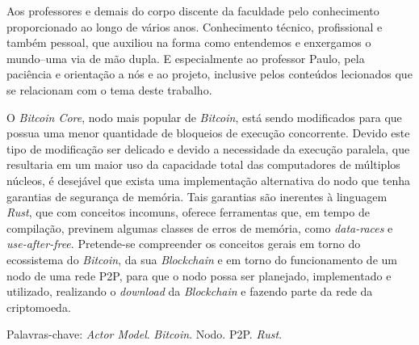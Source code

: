 
\OnehalfSpacing

\imprimircapa

\imprimirfolhaderosto





\begin{agradecimentos}[Agradecimentos]
Aos professores e demais do corpo discente da faculdade pelo conhecimento proporcionado ao longo de vários anos. Conhecimento técnico, profissional e também pessoal, que auxiliou na forma como entendemos e enxergamos o mundo--uma via de mão dupla. E especialmente ao professor Paulo, pela paciência e orientação a nós e ao projeto, inclusive pelos conteúdos lecionados que se relacionam com o tema deste trabalho.
\end{agradecimentos}



\begin{resumo}
O \textit{Bitcoin Core}, nodo mais popular de \textit{Bitcoin}, está sendo modificados para que possua uma menor quantidade de bloqueios de execução concorrente. Devido este tipo de modificação ser delicado e devido a necessidade da execução paralela, que resultaria em um maior uso da capacidade total das computadores de múltiplos núcleos, é desejável que exista uma implementação alternativa do nodo que tenha garantias de segurança de memória. Tais garantias são inerentes à linguagem \textit{Rust}, que com conceitos incomuns, oferece ferramentas que, em tempo de compilação, previnem algumas classes de erros de memória, como \textit{data-races} e \textit{use-after-free}.
Pretende-se compreender os conceitos gerais em torno do ecossistema do \textit{Bitcoin}, da sua \textit{Blockchain} e em torno do funcionamento de um nodo de uma rede P2P, para que o nodo possa ser planejado, implementado e utilizado, realizando o \textit{download} da \textit{Blockchain} e fazendo parte da rede da criptomoeda.

Palavras-chave: \textit{Actor Model}. \textit{Bitcoin}. Nodo. P2P. \textit{Rust}.
\end{resumo}

